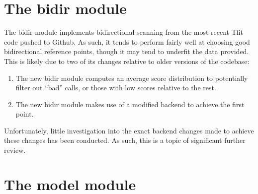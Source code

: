 \documentclass[12pt,letterpaper]{article}
\begin{document}
\section{The bidir module}
The bidir module implements bidirectional scanning from the most recent Tfit code pushed to Github. As such, it tends to perform fairly well at choosing good bidirectional reference points, though it may tend to underfit the data provided. This is likely due to two of its changes relative to older versions of the codebase:

\begin{enumerate}
\item The new bidir module computes an average score distribution to potentially filter out ``bad'' calls, or those with low scores relative to the rest.
\item The new bidir module makes use of a modified backend to achieve the first point.
\end{enumerate}

Unfortunately, little investigation into the exact backend changes made to achieve these changes has been conducted. As such, this is a topic of significant further review.

\section{The model module}
\end{document}
